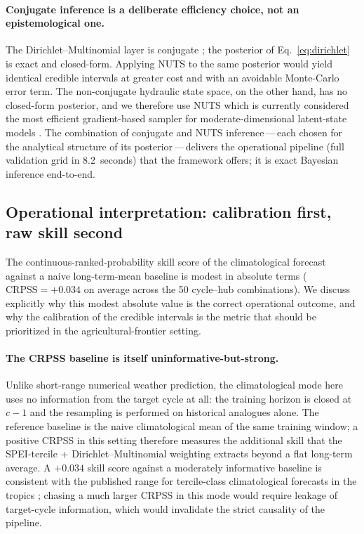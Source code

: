 \documentclass[review,5p,times]{elsarticle}
\begin{document}
\paragraph{Conjugate inference is a deliberate efficiency choice,
not an epistemological one.} The Dirichlet--Multinomial layer is
conjugate \citep{Gelman2013}; the posterior of
Eq.~\ref{eq:dirichlet} is exact and closed-form. Applying NUTS to
the same posterior would yield identical credible intervals at
greater cost and with an avoidable Monte-Carlo error term. The
non-conjugate hydraulic state space, on the other hand, has no
closed-form posterior, and we therefore use NUTS \citep{Hoffman2014}
which is currently considered the most efficient gradient-based
sampler for moderate-dimensional latent-state models
\citep{Betancourt2017}. The combination of conjugate and NUTS
inference\,---\,each chosen for the analytical structure of its
posterior\,---\,delivers the operational pipeline (full validation
grid in 8.2~seconds) that the framework offers; it is exact
Bayesian inference end-to-end.

\subsection{Operational interpretation: calibration first, raw skill
second}\label{sec:discussion_calibration_first}

The continuous-ranked-probability skill score of the
climatological forecast against a naive long-term-mean baseline is
modest in absolute terms ($\mathrm{CRPSS}=+0.034$ on average across
the 50 cycle--hub combinations). We discuss explicitly why this
modest absolute value is the correct operational outcome, and why
the calibration of the credible intervals is the metric that should
be prioritized in the agricultural-frontier setting.

\paragraph{The CRPSS baseline is itself uninformative-but-strong.}
Unlike short-range numerical weather prediction, the climatological
mode here uses no information from the target cycle at all: the
training horizon is closed at $c-1$ and the resampling is performed
on historical analogues alone. The reference baseline is the naive
climatological mean of the same training window; a positive CRPSS in
this setting therefore measures the additional skill that the
SPEI-tercile + Dirichlet--Multinomial weighting extracts beyond a
flat long-term average. A $+0.034$ skill score against a
moderately informative baseline is consistent with the published
range for tercile-class climatological forecasts in the tropics
\citep{Hersbach2000}; chasing a much larger CRPSS in this mode would
require leakage of target-cycle information, which would invalidate
the strict causality of the pipeline.
\end{document}
